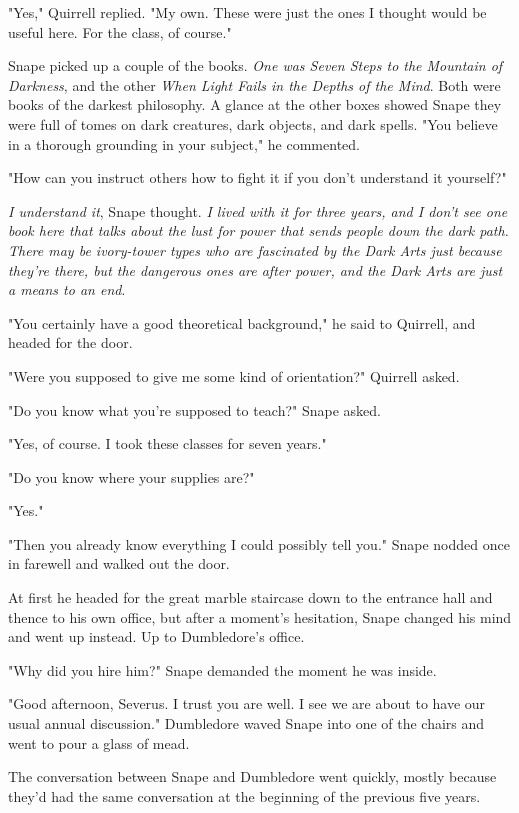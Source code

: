 "Yes," Quirrell replied. "My own. These were just the ones I thought would be useful here. For the class, of course."

Snape picked up a couple of the books. \emph{One was Seven Steps to the Mountain of Darkness}, and the other \emph{When Light Fails in the Depths of the Mind}. Both were books of the darkest philosophy. A glance at the other boxes showed Snape they were full of tomes on dark creatures, dark objects, and dark spells. "You believe in a thorough grounding in your subject," he commented.

"How can you instruct others how to fight it if you don't understand it yourself?"

\emph{I understand it}, Snape thought. \emph{I lived with it for three years, and I don't see one book here that talks about the lust for power that sends people down the dark path. There may be ivory-tower types who are fascinated by the Dark Arts just because they're there, but the dangerous ones are after power, and the Dark Arts are just a means to an end}.

"You certainly have a good theoretical background," he said to Quirrell, and headed for the door.

"Were you supposed to give me some kind of orientation?" Quirrell asked.

"Do you know what you're supposed to teach?" Snape asked.

"Yes, of course. I took these classes for seven years."

"Do you know where your supplies are?"

"Yes."

"Then you already know everything I could possibly tell you." Snape nodded once in farewell and walked out the door.

At first he headed for the great marble staircase down to the entrance hall and thence to his own office, but after a moment's hesitation, Snape changed his mind and went up instead. Up to Dumbledore's office.

"Why did you hire him?" Snape demanded the moment he was inside.

"Good afternoon, Severus. I trust you are well. I see we are about to have our usual annual discussion." Dumbledore waved Snape into one of the chairs and went to pour a glass of mead.

The conversation between Snape and Dumbledore went quickly, mostly because they'd had the same conversation at the beginning of the previous five years.

